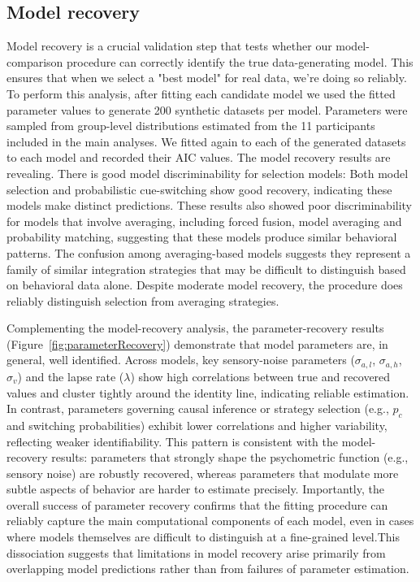 \documentclass[9pt,lineno,doublespacing]{elife}
\begin{document}
\subsection{Model recovery}

Model recovery is a crucial validation step that tests whether our model-comparison procedure can correctly identify the true data-generating model. This ensures that when we select a "best model" for real data, we're doing so reliably. 
To perform this analysis, after fitting each candidate model we used the fitted parameter values to generate 200 synthetic datasets per model. Parameters were sampled from group-level distributions estimated from the 11 participants included in the main analyses.
We fitted again to each of the generated datasets to each model and recorded their AIC values.
The model recovery results are revealing. There is good model discriminability for selection models: Both model selection and probabilistic cue-switching show good recovery, indicating these models make distinct predictions.
These results also showed poor discriminability for models that involve averaging, including forced fusion, model averaging and probability matching, suggesting that these models produce similar behavioral patterns. The confusion among averaging-based models suggests they represent a family of similar integration strategies that may be difficult to distinguish based on behavioral data alone. Despite moderate model recovery, the procedure does reliably distinguish selection from averaging strategies.

Complementing the model-recovery analysis, the parameter-recovery results (Figure~\ref{fig:parameterRecovery}) demonstrate that model parameters are, in general, well identified. Across models, key sensory-noise parameters ($\sigma_{a,l}$, $\sigma_{a,h}$, $\sigma_v$) and the lapse rate ($\lambda$) show high correlations between true and recovered values and cluster tightly around the identity line, indicating reliable estimation. In contrast, parameters governing causal inference or strategy selection (e.g., $p_c$ and switching probabilities) exhibit lower correlations and higher variability, reflecting weaker identifiability. This pattern is consistent with the model-recovery results: parameters that strongly shape the psychometric function (e.g., sensory noise) are robustly recovered, whereas parameters that modulate more subtle aspects of behavior are harder to estimate precisely. Importantly, the overall success of parameter recovery confirms that the fitting procedure can reliably capture the main computational components of each model, even in cases where models themselves are difficult to distinguish at a fine-grained level.This dissociation suggests that limitations in model recovery arise primarily from overlapping model predictions rather than from failures of parameter estimation.

%
%





\end{document}
